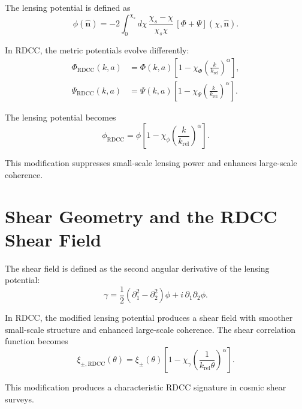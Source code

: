 \documentclass[11pt,a4paper]{article}
\begin{document}
The lensing potential is defined as
\begin{equation}
    \phi(\hat{\mathbf{n}})
    = -2 \int_{0}^{\chi_{s}}
      d\chi\,
      \frac{\chi_{s} - \chi}{\chi_{s}\chi}\,
      \left[\Phi + \Psi\right](\chi,\hat{\mathbf{n}}).
\end{equation}

In RDCC, the metric potentials evolve differently:
\begin{align}
    \Phi_{\mathrm{RDCC}}(k,a)
    &= \Phi(k,a)
       \left[
         1 - \chi_{\Phi}
         \left(\frac{k}{k_{\mathrm{rel}}}\right)^{\alpha}
       \right], \\
    \Psi_{\mathrm{RDCC}}(k,a)
    &= \Psi(k,a)
       \left[
         1 - \chi_{\Psi}
         \left(\frac{k}{k_{\mathrm{rel}}}\right)^{\alpha}
       \right].
\end{align}

The lensing potential becomes
\begin{equation}
    \phi_{\mathrm{RDCC}}
    = \phi
      \left[
        1 - \chi_{\phi}
        \left(\frac{k}{k_{\mathrm{rel}}}\right)^{\alpha}
      \right].
\end{equation}

This modification suppresses small-scale lensing power and enhances large-scale 
coherence.
\section{Shear Geometry and the RDCC Shear Field}

The shear field is defined as the second angular derivative of the lensing 
potential:
\begin{equation}
    \gamma = \frac{1}{2}
             \left(
               \partial_{1}^{2}
               - \partial_{2}^{2}
             \right)\phi
             + i\,\partial_{1}\partial_{2}\phi.
\end{equation}

In RDCC, the modified lensing potential produces a shear field with smoother 
small-scale structure and enhanced large-scale coherence. The shear correlation 
function becomes
\begin{equation}
    \xi_{\pm,\mathrm{RDCC}}(\theta)
    = \xi_{\pm}(\theta)
      \left[
        1 - \chi_{\gamma}
        \left(\frac{1}{k_{\mathrm{rel}}\theta}\right)^{\alpha}
      \right].
\end{equation}

This modification produces a characteristic RDCC signature in cosmic shear surveys.
\end{document}
